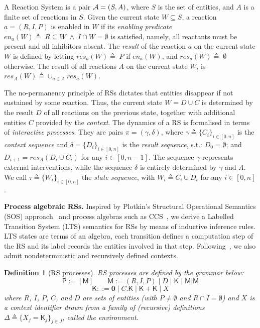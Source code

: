 \documentclass[sn-mathphys-num,a4paper,iicol,lineno,pdflatex]{sn-jnl-hacked}
\newcommand{\nil}{\mathbf{0}}
\theoremstyle{thmstyleone}%
\theoremstyle{thmstyletwo}%
\theoremstyle{thmstylethree}%
\newtheorem{definition}{Definition}%
\begin{document}
A Reaction System is a pair ${\cal A} = (S, A)$, where $S$ is the set of entities, and $A$ is a finite set of reactions in $S$.
Given the current state $W\subseteq S$, a reaction $a = (R,I,P)$ is enabled in $W$ if its \emph{enabling predicate}
$
\mathit{en}_a(W)\triangleq\; R \subseteq W\; \wedge\; I \cap W = \emptyset
$
is satisfied, namely, all reactants must be present and all inhibitors absent.
The \emph{result} of the reaction $a$ on the current state $W$ is defined by letting
$
\mathit{res}_a(W) \triangleq\;
P$ if $\mathit{en}_a(W)$, and
$\mathit{res}_a(W) \triangleq\; \emptyset$ otherwise.
The result of all reactions $A$ on the current state $W$, is $\mathit{res}_A(W) \triangleq \cup_{a \in A} \mathit{res}_a(W)$.

The no-permanency principle of RSs dictates that entities disappear if not sustained by some reaction.
Thus, the current state $W=D\cup C$ is determined by the result $D$ of all reactions on the previous state, together with additional entities $C$ provided by the \emph{context}. 
The dynamics of a RS is formalised in terms of {\em interactive processes}.
They are pairs $\pi = (\gamma, \delta)$, where $\gamma\triangleq \{C_i\}_{i\in[0,n]}$ is the {\em context sequence} and $\delta=\{D_i\}_{i\in[0,n]} $ is the {\em result sequence}, s.t.: 
$D_0 = \emptyset$; and 
$D_{i+1} =  \mathit{res}_{A}(D_{i} \cup C_{i})$ for any $i \in [0,n-1]$.
The sequence $\gamma$ represents external interventions, while the sequence $\delta$ is entirely determined by $\gamma$ and $A$.
We call $\tau \triangleq \{W_{i}\}_{i\in[0,n]}$  the \emph{state sequence}, with $W_{i} \triangleq C_{i} \cup D_{i}$ for any $i \in [0, n]$.

\medskip
\noindent
\textbf{Process algebraic RSs.}
Inspired by Plotkin's Structural Operational Semantics (SOS) approach~\cite{DBLP:journals/jlp/Plotkin04a} and process algebras such as CCS~\cite{Milner80}, we derive a Labelled Transition System (LTS) semantics for RSs by means of inductive inference rules. LTS states are terms of an algebra, each transition defines a computation step of the RS and its label records the entities involved in that step.
Following~\cite{DBLP:journals/tcs/BrodoBF21}, we also admit nondeterministic and recursively defined contexts.
%
\begin{definition}[RS processes]\label{def:LTSforRS}
\emph{RS processes} are defined by the grammar below:
\[
\mathsf{P}:=[\mathsf{M}]
\qquad
\mathsf{M}:=(R,I,P) \mid D \mid \mathsf{K} \mid \mathsf{M}|\mathsf{M}
\]
\[
\mathsf{K}::=\nil \mid C.\mathsf{K} \mid \mathsf{K}+\mathsf{K} \mid X
\]
where $R$, $I$, $P$, $C$, and $D$ are sets of entities (with $P\neq \emptyset$ and $R\cap I=\emptyset$) and $X$ is a context identifier drawn from a family of (recursive) definitions $\Delta \triangleq\{X_j=\mathsf{K}_j\}_{j\in J}$, called the environment.
\end{definition}
\end{document}
